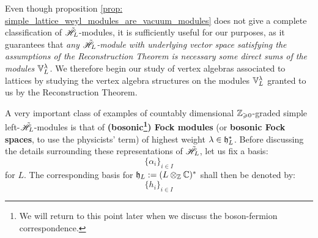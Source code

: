         Even though proposition \ref{prop: simple_lattice_weyl_modules_are_vacuum_modules} does not give a complete classification of $\tilde{\mathscr{H}}_L$-modules, it is sufficiently useful for our purposes, as it guarantees that \textit{any $\tilde{\mathscr{H}}_L$-module with underlying vector space satisfying the assumptions of the Reconstruction Theorem is necessary some direct sums of the modules $\mathbb{V}_L^{\lambda}$.} We therefore begin our study of vertex algebras associated to lattices by studying the vertex algebra structures on the modules $\mathbb{V}_L^{\lambda}$ granted to us by the Reconstruction Theorem. 
        \begin{example} \label{example: bosonic_fock_modules}
            A very important class of examples of countably dimensional $\mathbb{Z}_{\geqslant 0}$-graded simple left-$\tilde{\mathscr{H}}_L$-modules is that of \textbf{(bosonic\footnote{We will return to this point later when we discuss the boson-fermion correspondence.}) Fock modules} (or \textbf{bosonic Fock spaces}, to use the physicists' term) of highest weight $\lambda \in \mathfrak{h}_L^*$. Before discussing the details surrounding these representations of $\tilde{\mathscr{H}}_L$, let us fix a basis:
                $$\{\alpha_i\}_{i \in I}$$
            for $L$. The corresponding basis for $\h_L := (L \tensor_{\Z} \bbC)^*$ shall then be denoted by:
                $$\{h_i\}_{i \in I}$$
            

\end{example}
